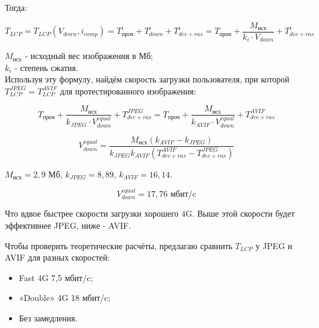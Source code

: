 \documentclass[12pt]{article}
\begin{document}
Тогда:

\[
    T_{LCP} = T_{LCP}(V_{down}, i_{comp}) = T^{i}_{\text{проч}} + T^{i}_{down} + T^{i}_{dec+ras} = T_{\text{проч}} + \frac{M_{\text{исх}}}{k_{i} \cdot V_{down}} + T^{i}_{dec+ras}
\]

$M_{\text{исх}}$ - исходный вес изображения в Мб; \\
$k_i$ - степень сжатия. \\

Используя эту формулу, найдём скорость загрузки пользователя, при которой $T^{JPEG}_{LCP} = T^{AVIF}_{LCP}$ для протестированного изображения:

\[
    T_{\text{проч}} + \frac{M_{\text{исх}}}{k_{JPEG} \cdot V^{equal}_{down}} + T^{JPEG}_{dec+ras} = T_{\text{проч}} + \frac{M_{\text{исх}}}{k_{AVIF} \cdot V^{equal}_{down}} + T^{AVIF}_{dec+ras}
\]

\begin{equation}
    V^{equal}_{down} = \frac{M_{\text{исх}}(k_{AVIF} - k_{JPEG})}{k_{JPEG}k_{AVIF}(T^{AVIF}_{dec+ras} - T^{JPEG}_{dec+ras})}
\end{equation}

$M_{\text{исх}} = 2{,}9\text{ Мб}$, $k_{JPEG} = 8{,}89$, $k_{AVIF} = 16{,}14$.

\[
    V^{equal}_{down} = 17{,}76 \text{ мбит/c}
\]

Что вдвое быстрее скорости загрузки хорошего 4G.
Выше этой скорости будет эффективнее JPEG, ниже - AVIF.

Чтобы проверить теоретические расчёты, предлагаю сравнить $T_{LCP}$ у JPEG
и AVIF для разных скоростей:

\begin{itemize}
    \item Fast 4G 7{,}5 мбит/c;
    \item «Double» 4G 18 мбит/c;
    \item Без замедления.
\end{itemize}
\end{document}
